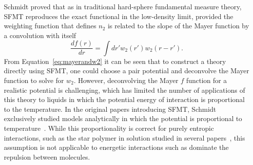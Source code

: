 \documentclass[letterpaper,twocolumn,amsmath,amssymb,prb]{revtex4-1}
\begin{document}
Schmidt proved that as in traditional hard-sphere fundamental measure theory, SFMT reproduces the exact functional in
the low-density limit, provided the weighting function that defines
$n_2$ is related to the slope of the Mayer function by a convolution
with itself
\begin{equation}\label{eq:mayerandw2}
  \frac{d f(r)}{dr} = \int dr' w_2(r') w_2 (r-r').
\end{equation}
From Equation~\ref{eq:mayerandw2} it can be seen that to construct a theory directly using SFMT, one could choose a pair potential and deconvolve the Mayer
function to solve for $w_2$. 
However, deconvolving the Mayer $f$ function for a realistic potential is challenging, which has limited the number of applications of this
theory to liquids in which the potential energy of interaction is
proportional to the temperature. 
In the original papers introducing SFMT, Schmidt
exclusively studied models analytically in which the potential is
proportional to temperature~\cite{schmidt1999density,
  schmidt2000fluid}.  While this proportionality is correct for purely
entropic interactions, such as the star polymer in solution studied in
several papers~\cite{schmidt1999density}, this assumption is not
applicable to energetic interactions such as dominate the repulsion
between molecules.
\end{document}
